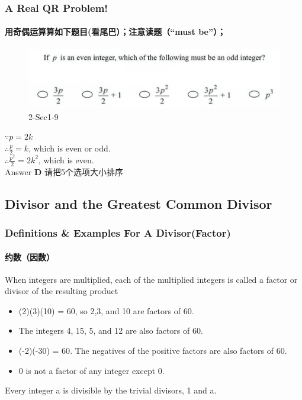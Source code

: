 \documentclass[
	11pt, %
	handout,
]{beamer}
\begin{document}
\begin{frame}
	\frametitle{A Real QR Problem!}
	\framesubtitle{用奇偶运算算如下题目(看尾巴）；注意读题（“must be”）；}
	\begin{figure}
		\includegraphics[width=\linewidth]{Even_Odd_Example_Question2.png}
		\caption{2-Sec1-9}
	\end{figure}
	\pause
	$\because p=2k$ \\ 
$\therefore \frac{p}{2}= k$, which is even or odd. \\
$\therefore \frac{p^2}{2}= 2k^2$, which is even. \\
\pause
\bigskip
Answer \textbf{D} 请把5个选项大小排序
\end{frame}


\subsection{Divisor and the Greatest Common Divisor}

\begin{frame}
	\frametitle{Definitions \& Examples For A Divisor(Factor)}
	\framesubtitle{约数（因数）}
	\begin{definition}
		When integers are multiplied, each of the multiplied integers is called a
\alert{factor or divisor} of the resulting product
	\end{definition}
	
	\smallskip %
	
	\begin{example}
		\begin{itemize}
			\item (2)(3)(10) = 60, so 2,3, and 10 are factors of 60. 
			\item The integers 4, 15, 5, and 12 are also factors of 60. 
			\item \alert{(-2)(-30) = 60}. The negatives of the positive factors are also factors of 60.
			\item 0 is \alert{not} a factor of any integer except \alert{0}.
		\end{itemize}
	\end{example}
	
	\begin{corollary}
		Every integer a is divisible by the trivial divisors, 1 and a. 
	\end{corollary}
\end{frame}
\end{document}
